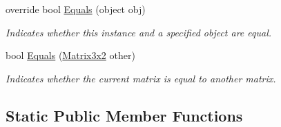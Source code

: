 \begin{DoxyCompactItemize}
override bool \hyperlink{struct_open_t_k_1_1_matrix3x2_ab4cbd1f75bde74f66f9ec947414db131}{Equals} (object obj)
\begin{DoxyCompactList}\small\item\em Indicates whether this instance and a specified object are equal. \end{DoxyCompactList}\item 
bool \hyperlink{struct_open_t_k_1_1_matrix3x2_aaea09adc1d69311dd3f9aa65f68c3912}{Equals} (\hyperlink{struct_open_t_k_1_1_matrix3x2}{Matrix3x2} other)
\begin{DoxyCompactList}\small\item\em Indicates whether the current matrix is equal to another matrix. \end{DoxyCompactList}\end{DoxyCompactItemize}
\subsection*{Static Public Member Functions}
